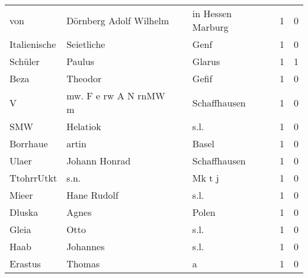\begin{center}
\begin{tiny}
\begin{longtabu}{llllrr}
                      von &             Dörnberg Adolf Wilhelm &             &                           in Hessen Marburg &          1 &         0 \\
             Italienische &                         Seietliche &             &                                        Genf &          1 &         0 \\
                  Schüler &                             Paulus &             &                                      Glarus &          1 &         1 \\
                     Beza &                            Theodor &             &                                       Gefif &          1 &         0 \\
                        V &              mw. F e rw A N rnMW m &             &                                Schaffhausen &          1 &         0 \\
                      SMW &                           Helatiok &             &                                        s.l. &          1 &         0 \\
                 Borrhaue &                              artin &             &                                       Basel &          1 &         0 \\
                    Ulaer &                      Johann Honrad &             &                                Schaffhausen &          1 &         0 \\
               TtohrrUtkt &                               s.n. &             &                                      Mk t j &          1 &         0 \\
                    Mieer &                        Hane Rudolf &             &                                        s.l. &          1 &         0 \\
                   Dluska &                              Agnes &             &                                       Polen &          1 &         0 \\
                    Gleia &                               Otto &             &                                        s.l. &          1 &         0 \\
                     Haab &                           Johannes &             &                                        s.l. &          1 &         0 \\
                  Erastus &                             Thomas &             &                                           a &          1 &         0 \\

\end{longtabu}
\end{tiny}
\end{center}
